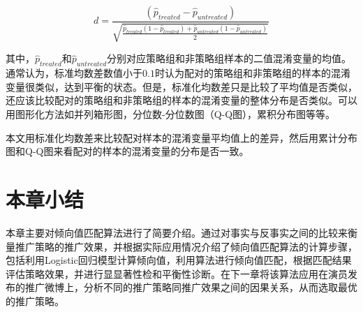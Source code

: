 \begin{equation}d = \frac{(\hat{p}_{treated} - \hat{p}_{untreated})}{\sqrt{\frac{\hat{p}_{treated}(1 - \hat{p}_{treated}) + \hat{p}_{untreated}(1 - \hat{p}_{untreated})}{2}}}\end{equation}

其中，$\hat{p}_{treated}$和$\hat{p}_{untreated}$分别对应策略组和非策略组样本的二值混淆变量的均值。通常认为，标准均数差数值小于$0.1$时认为配对的策略组和非策略组的样本的混淆变量很类似，达到平衡的状态\cite{normand2001validating}。但是，标准化均数差只是比较了平均值是否类似，还应该比较配对的策略组和非策略组的样本的混淆变量的整体分布是否类似。可以用图形化方法如并列箱形图，分位数-分位数图（Q-Q图），累积分布图等等。

本文用标准化均数差来比较配对样本的混淆变量平均值上的差异，然后用累计分布图和Q-Q图来看配对的样本的混淆变量的分布是否一致。

\section{本章小结}

本章主要对倾向值匹配算法进行了简要介绍。通过对事实与反事实之间的比较来衡量推广策略的推广效果，并根据实际应用情况介绍了倾向值匹配算法的计算步骤，包括利用Logistic回归模型计算倾向值，利用算法进行倾向值匹配，根据匹配结果评估策略效果，并进行显显著性检和平衡性诊断。在下一章将该算法应用在演员发布的推广微博上，分析不同的推广策略同推广效果之间的因果关系，从而选取最优的推广策略。






















